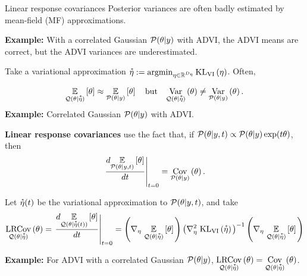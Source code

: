 \documentclass[8pt]{beamer}\usepackage[]{graphicx}\usepackage[]{color}
\begin{document}
\begin{frame}{Linear response covariances}
%
Posterior variances are often badly estimated by mean-field (MF) approximations.

\textbf{Example: } With a correlated Gaussian $\mathcal{P}(\theta \vert y)$ with ADVI,
the ADVI means are correct, but the ADVI variances are underestimated.

Take a variational approximation 
$\accentset{*}{\eta} := \operatorname*{\mathrm{argmin}}_{\eta \in \mathbb{R}^{D_{\eta}}} \mathrm{KL}_{\mathrm{VI}}\left(\eta\right)$.  Often,

\begin{align}\label{eq:mfvb_conceit}
    \underset{\mathcal{Q}(\theta \vert \accentset{*}{\eta})}{\mathbb{E}}\left[\theta\right] \approx
    \underset{\mathcal{P}(\theta \vert y)}{\mathbb{E}}\left[\theta\right] \quad\textrm{but}\quad
    \underset{\mathcal{Q}(\theta \vert \accentset{*}{\eta})}{\mathrm{Var}}\left(\theta\right) \ne
    \underset{\mathcal{P}(\theta \vert y)}{\mathrm{Var}}\left(\theta\right).
\end{align}    
%
\textbf{Example: }Correlated Gaussian $\mathcal{P}(\theta \vert y)$ with ADVI.

\textbf{Linear response covariances} use the fact that, if
$\mathcal{P}(\theta \vert y, t) \propto \mathcal{P}(\theta \vert y) \exp(t \theta)$, then
%
\begin{align}\label{eq:deriv_is_cov}
    \left. \frac{d \underset{\mathcal{P}(\theta \vert y, t)}{\mathbb{E}}\left[\theta\right]}{dt} \right|_{t=0} = \underset{\mathcal{P}(\theta \vert y)}{\mathrm{Cov}}\left(\theta\right).
\end{align}

Let $\accentset{*}{\eta}(t)$ be the variational approximation to $\mathcal{P}(\theta \vert y, t)$, and
take
%
\begin{align*}
    \underset{\mathcal{Q}(\theta \vert \accentset{*}{\eta})}{\mathrm{LRCov}}\left(\theta\right)
    =
    \left. \frac{d \underset{\mathcal{Q}(\theta \vert \accentset{*}{\eta}(t))}{\mathbb{E}}\left[\theta\right]}{dt} \right|_{t=0}
    =
    \left( \nabla_{\eta} \left. \underset{\mathcal{Q}(\theta \vert \accentset{*}{\eta})}{\mathbb{E}}\left[\theta\right] \right.\right)
    \left(\nabla^2_{\eta} \left. \mathrm{KL}_{\mathrm{VI}}\left(\accentset{*}{\eta}\right) \right. \right)^{-1}
    \left( \nabla_{\eta} \left. \underset{\mathcal{Q}(\theta \vert \accentset{*}{\eta})}{\mathbb{E}}\left[\theta\right] \right.\right)
\end{align*}
%

\textbf{Example: } For ADVI with a correlated Gaussian $\mathcal{P}(\theta \vert y)$,
$\underset{\mathcal{Q}(\theta \vert \accentset{*}{\eta})}{\mathrm{LRCov}}\left(\theta\right)  = \underset{\mathcal{Q}(\theta \vert \accentset{*}{\eta})}{\mathrm{Cov}}\left(\theta\right)$.


\end{frame}
\end{document}
